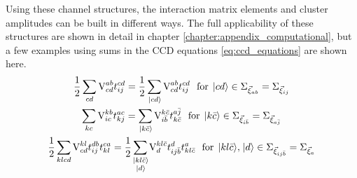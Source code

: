 \documentclass[thesis.tex]{subfiles}
\begin{document}
Using these channel structures, the interaction matrix elements and cluster amplitudes can be built in different ways.  The full applicability of these structures are shown in detail in chapter \ref{chapter:appendix_computational}, but a few examples using sums in the CCD equations \eqref{eq:ccd_equations} are shown here.
\begin{gather} \label{eq:channel_sums}
  \frac{1}{2}\sum\limits_{\mathclap{cd}}\vint{ab}{cd}\tamp{cd}{ij} = \frac{1}{2}\sum\limits_{\mathclap{\ket{cd}}}\vint{ab}{cd}\tamp{cd}{ij}\ \ \text{for}\ \ket{cd} \in \Sigma_{\vec{\xi}_{ab}}=\Sigma_{\vec{\xi}_{ij}} \notag \\
  \sum\limits_{\mathclap{kc}}\vint{kb}{ic}\tamp{ac}{kj} = \sum\limits_{\mathclap{\ket{k\bar{c}}}}\vint{k\bar{c}}{i\bar{b}}\tamp{a\bar{j}}{k\bar{c}}\ \ \text{for}\ \ket{k\bar{c}} \in \Sigma_{\vec{\xi}_{i\bar{b}}}=\Sigma_{\vec{\xi}_{a\bar{j}}} \notag \\
  \frac{1}{2}\sum\limits_{\mathclap{klcd}}\vint{kl}{cd}\tamp{db}{ij}\tamp{ca}{kl} = \frac{1}{2}\sum\limits_{\mathclap{\substack{\ket{kl\bar{c}} \\ \ket{d}}}}\vint{kl\bar{c}}{d}\tamp{d}{ij\bar{b}}\tamp{a}{kl\bar{c}}\ \ \text{for}\ \ket{kl\bar{c}},\ket{d} \in \Sigma_{\vec{\xi}_{ij\bar{b}}}=\Sigma_{\vec{\xi}_{a}}
\end{gather}
\end{document}
